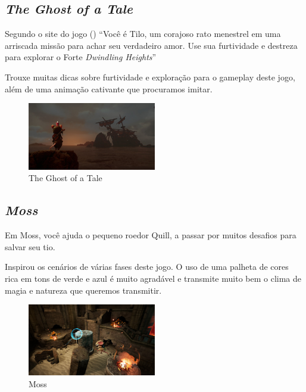 \clearpage

\subsection{\textit{The Ghost of a Tale}} Segundo o site do jogo (\citeyear{Ghostofa36:online})  ``Você é Tilo,
um corajoso rato menestrel em uma arriscada missão para achar seu verdadeiro
amor. Use sua furtividade e destreza para explorar o Forte \textit{Dwindling
Heights}''

Trouxe muitas dicas sobre furtividade e exploração para o gameplay deste jogo, além de uma animação cativante que procuramos imitar.

\begin{figure}[!htb] \caption{\label{tale}The Ghost of a Tale} \begin{center}
\includegraphics[width=0.5\textwidth]{imagens/tale.jpg} \end{center}
 \end{figure}

\clearpage

\subsection{\textit{Moss}}
Em Moss, você ajuda o pequeno roedor Quill, a passar por muitos desafios para salvar seu tio. \cite{Moss18}

Inspirou os cenários de várias fases deste jogo. O uso de uma palheta de cores rica em tons de verde e azul é muito agradável e transmite muito bem o clima de magia e natureza que queremos transmitir. 

\begin{figure}[!htb] \caption{\label{fig_moss}Moss} \begin{center}
\includegraphics[width=0.5\textwidth]{imagens/moss.jpg} \end{center}
 \end{figure}

